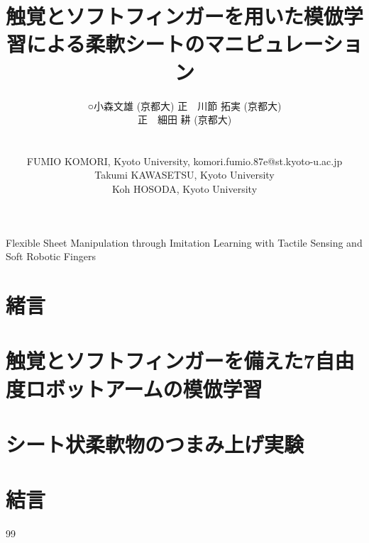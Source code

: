 \documentclass{jarticle}
\makeatletter
\def\authorinfo{
    \begin{tabular}{ll}
		○\hspace{1zw}小森文雄 (京都大)
        \hspace{1zw}正　川節 拓実 (京都大)\\
        \hspace{1zw}正　細田 耕 (京都大) 
    \end{tabular}
    \smallskip \\  %
    \begin{tabular}{l}
        {\small FUMIO KOMORI, Kyoto University, komori.fumio.87e@st.kyoto-u.ac.jp}\\
        {\small Takumi KAWASETSU, Kyoto University}\\
        {\small Koh HOSODA, Kyoto University}
    \end{tabular}
}
\makeatother
\begin{document}
\makeatletter
\title{触覚とソフトフィンガーを用いた模倣学習による柔軟シートのマニピュレーション
}
{Flexible Sheet Manipulation through Imitation Learning with Tactile Sensing and Soft Robotic Fingers}

\author{\authorinfo}
\makeatother

\abstract{}


\maketitle
\thispagestyle{empty}
\pagestyle{empty}

\maintext

\section{緒言}%


\section{触覚とソフトフィンガーを備えた7自由度ロボットアームの模倣学習}


\section{シート状柔軟物のつまみ上げ実験}


%  

\section{結言}




\footnotesize
\begin{thebibliography}{99}

\end{thebibliography}
\normalsize
\end{document}

